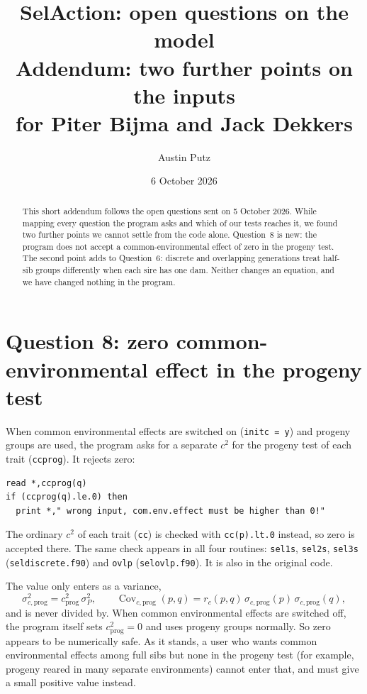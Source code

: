 \documentclass[11pt]{article}
\title{SelAction: open questions on the model\\[4pt]
\large Addendum: two further points on the inputs\\
for Piter Bijma and Jack Dekkers}
\author{Austin Putz}
\date{6 October 2026}
\newcommand{\src}[1]{\texttt{#1}}
\newcommand{\Cov}{\operatorname{Cov}}
\begin{document}
\maketitle

\begin{abstract}
This short addendum follows the open questions sent on 5 October 2026. While mapping every question the program asks and which of our tests reaches it, we found two further points we cannot settle from the code alone. Question~8 is new: the program does not accept a common-environmental effect of zero in the progeny test. The second point adds to Question~6: discrete and overlapping generations treat half-sib groups differently when each sire has one dam. Neither changes an equation, and we have changed nothing in the program.
\end{abstract}

\section{Question 8: zero common-environmental effect in the progeny test}\label{sec:q8}

When common environmental effects are switched on (\src{initc = y}) and progeny groups are used, the program asks for a separate $c^2$ for the progeny test of each trait (\src{ccprog}). It rejects zero:

\begin{lstlisting}
read *,ccprog(q)
if (ccprog(q).le.0) then
  print *," wrong input, com.env.effect must be higher than 0!"
\end{lstlisting}

The ordinary $c^2$ of each trait (\src{cc}) is checked with \src{cc(p).lt.0} instead, so zero is accepted there. The same check appears in all four routines: \src{sel1s}, \src{sel2s}, \src{sel3s} (\src{seldiscrete.f90}) and \src{ovlp} (\src{selovlp.f90}). It is also in the original code.

The value only enters as a variance,
\begin{equation*}
\sigma^2_{c,\mathrm{prog}} = c^2_{\mathrm{prog}}\,\sigma^2_P,
\qquad
\Cov_{c,\mathrm{prog}}(p,q) = r_c(p,q)\,\sigma_{c,\mathrm{prog}}(p)\,\sigma_{c,\mathrm{prog}}(q),
\end{equation*}
and is never divided by. When common environmental effects are switched off, the program itself sets $c^2_{\mathrm{prog}}=0$ and uses progeny groups normally. So zero appears to be numerically safe. As it stands, a user who wants common environmental effects among full sibs but none in the progeny test (for example, progeny reared in many separate environments) cannot enter that, and must give a small positive value instead.
\end{document}
